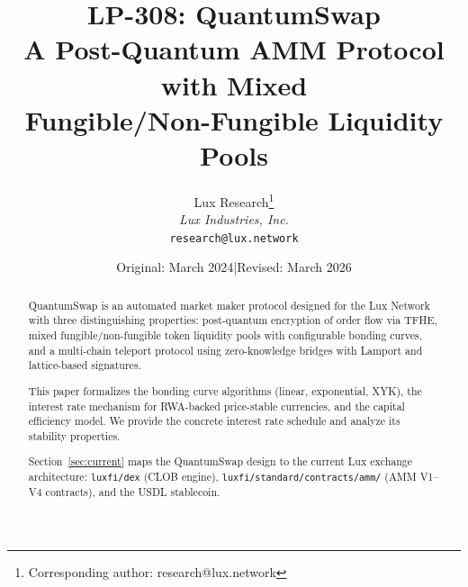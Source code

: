 \documentclass[11pt,a4paper]{article}
\title{LP-308: QuantumSwap\\[4pt]
\large A Post-Quantum AMM Protocol with Mixed\\
Fungible/Non-Fungible Liquidity Pools}
\author{
Lux Research\thanks{Corresponding author: research@lux.network}\\
\textit{Lux Industries, Inc.}\\
\texttt{research@lux.network}
}
\date{Original: March 2024\quad|\quad Revised: March 2026}
\begin{document}
\luxcoverpage

\begin{abstract}
QuantumSwap is an automated market maker protocol designed for the
Lux Network with three distinguishing properties: post-quantum
encryption of order flow via TFHE, mixed fungible/non-fungible token
liquidity pools with configurable bonding curves, and a multi-chain
teleport protocol using zero-knowledge bridges with Lamport and
lattice-based signatures.

This paper formalizes the bonding curve algorithms (linear,
exponential, XYK), the interest rate mechanism for RWA-backed
price-stable currencies, and the capital efficiency model. We provide
the concrete interest rate schedule and analyze its stability
properties.

Section~\ref{sec:current} maps the QuantumSwap design to the current
Lux exchange architecture: \texttt{luxfi/dex} (CLOB engine),
\texttt{luxfi/standard/contracts/amm/} (AMM V1--V4 contracts), and
the USDL stablecoin.
\end{abstract}

\tableofcontents
\newpage











\end{document}
